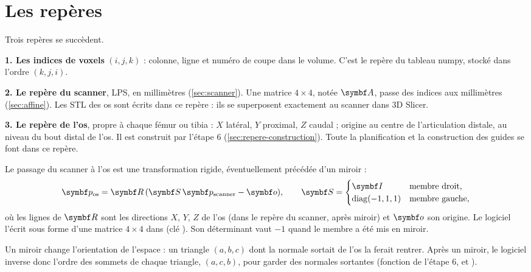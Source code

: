 \section{Les repères}
\label{sec:repere-os}

Trois repères se succèdent.

\textbf{1. Les indices de voxels} $(i, j, k)$ : colonne, ligne et numéro de coupe dans le volume. C'est le repère
du tableau numpy, stocké dans l'ordre $(k, j, i)$.

\textbf{2. Le repère du scanner}, LPS, en millimètres (\cref{sec:scanner}). Une matrice $4 \times 4$, notée
$\mt{A}$, passe des indices aux millimètres (\cref{sec:affine}). Les STL des os sont écrits dans ce repère : ils se
superposent exactement au scanner dans 3D Slicer.

\textbf{3. Le repère de l'os}, propre à chaque fémur ou tibia : $X$ latéral, $Y$ proximal, $Z$ caudal ; origine au
centre de l'articulation distale, au niveau du bout distal de l'os. Il est construit par l'étape 6
(\cref{sec:repere-construction}). Toute la planification et la construction des guides se font dans ce repère.

Le passage du scanner à l'os est une transformation rigide, éventuellement précédée d'un miroir :
\begin{equation}
  \vb{p}_{\text{os}} = \mt{R}\,(\mt{S}\,\vb{p}_{\text{scanner}} - \vb{o}),
  \qquad
  \mt{S} = \begin{cases} \mt{I} & \text{membre droit,} \\ \operatorname{diag}(-1, 1, 1) & \text{membre gauche,} \end{cases}
  \label{eq:repere-os}
\end{equation}
où les lignes de $\mt{R}$ sont les directions $X$, $Y$, $Z$ de l'os (dans le repère du scanner, après miroir) et
$\vb{o}$ son origine. Le logiciel l'écrit sous forme d'une matrice $4 \times 4$ dans 
(clé ). Son déterminant vaut $-1$ quand le membre a été mis en miroir.

\begin{attention}[title={Le miroir retourne les triangles}]
Un miroir change l'orientation de l'espace : un triangle $(a, b, c)$ dont la normale sortait de l'os la ferait
rentrer. Après un miroir, le logiciel inverse donc l'ordre des sommets de chaque triangle, $(a, c, b)$, pour garder
des normales sortantes (fonction  de l'étape 6, et ).
\end{attention}

